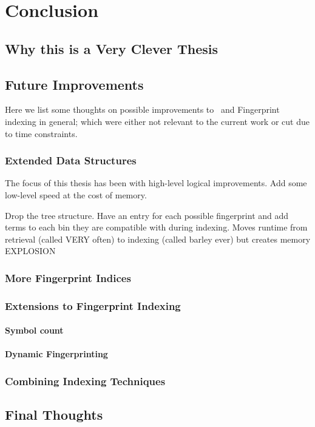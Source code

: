 
\chapter{Conclusion}
\label{cha:conclusion}

\section{Why this is a Very Clever Thesis}
\label{sec:why}

\section{Future Improvements}
\label{sec:future}

Here we list some thoughts on possible improvements to \beagle\ and Fingerprint
indexing in general; which were either not relevant to the current work or
cut due to time constraints.

\subsection{Extended Data Structures}
The focus of this thesis has been with high-level logical improvements.
Add some low-level speed at the cost of memory.

Drop the tree structure. Have an entry for each possible fingerprint and add terms
to each bin they are compatible with during indexing. Moves runtime from
retrieval (called VERY often) to indexing (called barley ever) but creates memory
EXPLOSION

\subsection{More Fingerprint Indices}

\subsection{Extensions to Fingerprint Indexing}

\subsubsection{Symbol count}
\subsubsection{Dynamic Fingerprinting}

\subsection{Combining Indexing Techniques}

\section{Final Thoughts}

